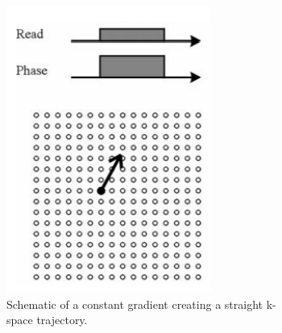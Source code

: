 \documentclass[english,version-2022-01]{uzl-thesis} %
\begin{document}
\begin{figure}[h] %
	\centering
	\graphicspath{{images/}{\main/images/}}
	\begin{subfigure}{0.445\textwidth}
    		\includegraphics[width=\textwidth]{constant_k-space_gradient.png}
    		\caption{Schematic of a constant gradient creating a straight k-space trajectory.}
    		\label{fig:constant_k-space_gradient}
	\end{subfigure}
	\hfill
	\begin{subfigure}{0.445\textwidth}

\end{subfigure}
\end{figure}
\end{document}
